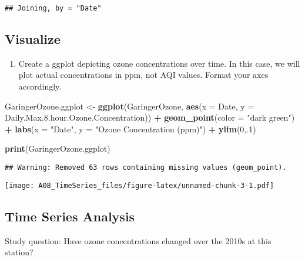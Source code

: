 \documentclass[]{article}
\newenvironment{Shaded}{\begin{snugshade}}{\end{snugshade}}
\newcommand{\DataTypeTok}[1]{\textcolor[rgb]{0.13,0.29,0.53}{#1}}
\newcommand{\DecValTok}[1]{\textcolor[rgb]{0.00,0.00,0.81}{#1}}
\newcommand{\FloatTok}[1]{\textcolor[rgb]{0.00,0.00,0.81}{#1}}
\newcommand{\KeywordTok}[1]{\textcolor[rgb]{0.13,0.29,0.53}{\textbf{#1}}}
\newcommand{\NormalTok}[1]{#1}
\newcommand{\OperatorTok}[1]{\textcolor[rgb]{0.81,0.36,0.00}{\textbf{#1}}}
\newcommand{\StringTok}[1]{\textcolor[rgb]{0.31,0.60,0.02}{#1}}
\providecommand{\tightlist}{%
  \setlength{\itemsep}{0pt}\setlength{\parskip}{0pt}}
\begin{document}
\begin{verbatim}
## Joining, by = "Date"
\end{verbatim}

\hypertarget{visualize}{%
\subsection{Visualize}\label{visualize}}

\begin{enumerate}
\def\labelenumi{\arabic{enumi}.}
\setcounter{enumi}{6}
\tightlist
\item
  Create a ggplot depicting ozone concentrations over time. In this
  case, we will plot actual concentrations in ppm, not AQI values.
  Format your axes accordingly.
\end{enumerate}

\begin{Shaded}
\begin{Highlighting}[]
\NormalTok{GaringerOzone.ggplot <-}
\KeywordTok{ggplot}\NormalTok{(GaringerOzone, }\KeywordTok{aes}\NormalTok{(}\DataTypeTok{x =}\NormalTok{ Date, }\DataTypeTok{y =}\NormalTok{ Daily.Max.}\FloatTok{8.}\NormalTok{hour.Ozone.Concentration)) }\OperatorTok{+}
\StringTok{  }\KeywordTok{geom_point}\NormalTok{(}\DataTypeTok{color =} \StringTok{"dark green"}\NormalTok{) }\OperatorTok{+}
\StringTok{  }\KeywordTok{labs}\NormalTok{(}\DataTypeTok{x =} \StringTok{"Date"}\NormalTok{, }\DataTypeTok{y =} \StringTok{"Ozone Concentration (ppm)"}\NormalTok{) }\OperatorTok{+}
\StringTok{  }\KeywordTok{ylim}\NormalTok{(}\DecValTok{0}\NormalTok{,.}\DecValTok{1}\NormalTok{)}

\KeywordTok{print}\NormalTok{(GaringerOzone.ggplot)}
\end{Highlighting}
\end{Shaded}

\begin{verbatim}
## Warning: Removed 63 rows containing missing values (geom_point).
\end{verbatim}

\texttt{[image: A08\_TimeSeries\_files/figure-latex/unnamed-chunk-3-1.pdf]}

\hypertarget{time-series-analysis}{%
\subsection{Time Series Analysis}\label{time-series-analysis}}

Study question: Have ozone concentrations changed over the 2010s at this
station?
\end{document}
